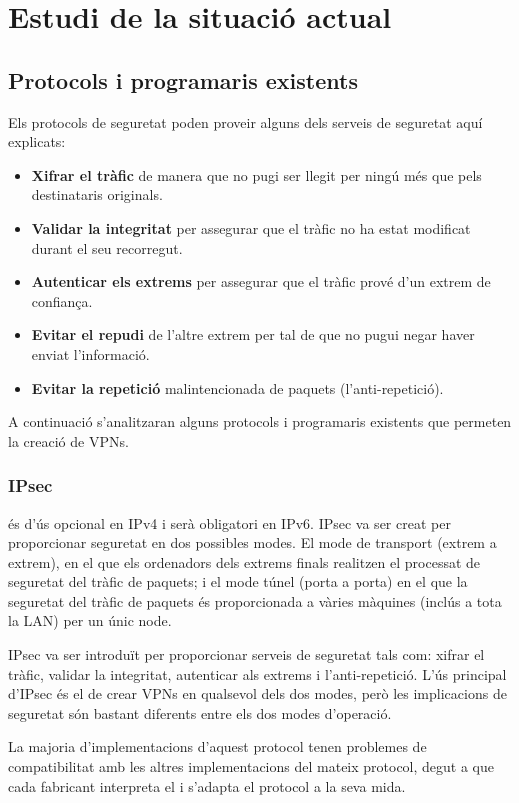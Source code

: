 \chapter{Estudi de la situació actual}
\section{Protocols i programaris existents}
Els protocols de seguretat poden proveir alguns dels serveis de seguretat aquí explicats:
\begin{itemize}
\item \textbf{Xifrar el tràfic} de manera que no pugi ser llegit per ningú més que pels destinataris originals.
\item \textbf{Validar la integritat} per assegurar que el tràfic no ha estat modificat durant el seu recorregut.
\item \textbf{Autenticar els extrems} per assegurar que el tràfic prové d'un extrem de confiança.
\item \textbf{Evitar el repudi} de l'altre extrem per tal de que no pugui negar haver enviat l'informació.
\item \textbf{Evitar la repetició} malintencionada de paquets (l'anti-repetició).
\end{itemize}

A continuació s'analitzaran alguns protocols i programaris existents que permeten la creació de VPNs.
\subsection{IPsec}
 és d'ús opcional en IPv4 i serà obligatori en IPv6. IPsec va ser creat per proporcionar seguretat en dos possibles modes. El mode de transport (extrem a extrem), en el que els ordenadors dels extrems finals realitzen el processat de seguretat del tràfic de paquets; i el mode túnel (porta a porta) en el que la seguretat del tràfic de paquets és proporcionada a vàries màquines (inclús a tota la LAN) per un únic node.

IPsec va ser introduït per proporcionar serveis de seguretat tals com: xifrar el tràfic, validar la integritat, autenticar als extrems i l'anti-repetició. L'ús principal d'IPsec és el de crear VPNs en qualsevol dels dos modes, però les implicacions de seguretat són bastant diferents entre els dos modes d'operació.

La majoria d'implementacions d'aquest protocol tenen problemes de compatibilitat amb les altres implementacions del mateix protocol, degut a que cada fabricant interpreta el \rfckeyword{} i s'adapta el protocol a la seva mida.

